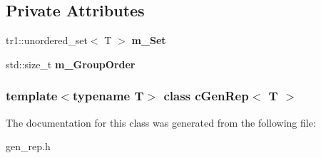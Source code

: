 \subsection*{\-Private \-Attributes}
\begin{DoxyCompactItemize}
\item 
\hypertarget{classcGenRep_af17e2ed953897003c229919293f6ecad}{
tr1\-::unordered\-\_\-set$<$ \-T $>$ {\bfseries m\-\_\-\-Set}}
\label{classcGenRep_af17e2ed953897003c229919293f6ecad}

\item 
\hypertarget{classcGenRep_aa7a645384a9a6036b4d860404557b88f}{
std\-::size\-\_\-t {\bfseries m\-\_\-\-Group\-Order}}
\label{classcGenRep_aa7a645384a9a6036b4d860404557b88f}

\end{DoxyCompactItemize}
\subsubsection*{template$<$typename T$>$ class c\-Gen\-Rep$<$ T $>$}



\-The documentation for this class was generated from the following file\-:\begin{DoxyCompactItemize}
\item 
gen\-\_\-rep.\-h\end{DoxyCompactItemize}
